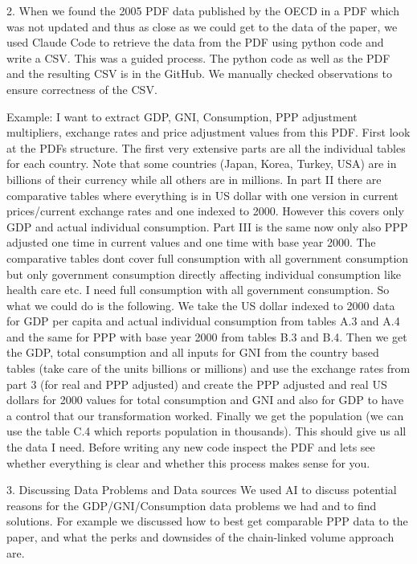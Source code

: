\documentclass{article}
\begin{document}
        2. When we found the 2005 PDF data published by the OECD in a PDF which was not updated and thus as close as we could get to the data of the paper, we used
        Claude Code to retrieve the data from the PDF using python code and write a CSV. This was a guided process. The python code as well as the PDF and the resulting CSV is in the GitHub.
        We manually checked observations to ensure correctness of the CSV.

        Example:
        I want to extract GDP, GNI, Consumption, PPP adjustment multipliers, exchange rates and price adjustment values from this PDF. First look at the PDFs structure. 
        The first very extensive parts are all the individual tables for each country. Note that some countries (Japan, Korea, Turkey, USA) are in billions of their currency while all others are in millions. 
        In part II there are comparative tables where everything is in US dollar with one version in current prices/current exchange rates and one indexed to 2000. However this covers only GDP and actual individual consumption.  
        Part III is the same now only also PPP adjusted one time in current values and one time with base year 2000. The comparative tables dont cover full consumption with all government consumption but only government consumption directly 
        affecting individual consumption like health care etc. I need full consumption with all government consumption. So what we could do is the following. We take the US dollar indexed to 2000 data for GDP per capita and actual individual 
        consumption from tables A.3 and A.4 and the same for PPP with base year 2000 from tables B.3 and B.4. Then we get the GDP, total consumption and all inputs for GNI from the country based tables (take care of the units billions or millions) 
        and use the exchange rates from part 3 (for real and PPP adjusted) and create the PPP adjusted and real US dollars for 2000 values for total consumption and GNI and also for GDP to have a control that our transformation worked. 
        Finally we get the population (we can use the table C.4 which reports population in thousands). This should give us all the data I need. 
        Before writing any new code inspect the PDF and lets see whether everything is clear and whether this process makes sense for you.

    
3. Discussing Data Problems and Data sources
    We used AI to discuss potential reasons for the GDP/GNI/Consumption data problems we had and to find solutions. For example we discussed how to best get comparable PPP data to the paper,
    and what the perks and downsides of the chain-linked volume approach are.
\end{document}
